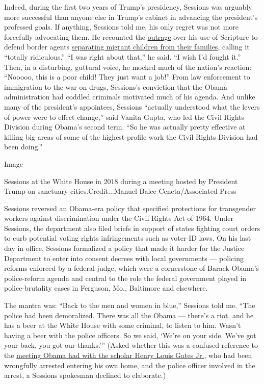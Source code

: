 Indeed, during the first two years of Trump's presidency, Sessions was
arguably more successful than anyone else in Trump's cabinet in
advancing the president's professed goals. If anything, Sessions told
me, his only regret was not more forcefully advocating them. He
recounted the
\href{https://www.nytimes3xbfgragh.onion/2018/06/15/us/sessions-bible-verse-romans.html}{outrage}
over his use of Scripture to defend border agents
\href{https://www.nytimes3xbfgragh.onion/2019/07/16/magazine/immigration-department-of-homeland-security.html}{separating
migrant children from their families}, calling it ``totally
ridiculous.'' ``I was right about that,'' he said. ``I wish I'd fought
it.'' Then, in a disturbing, guttural voice, he mocked much of the
nation's reaction: ``Nooooo, this is a poor child! They just want a
job!'' From law enforcement to immigration to the war on drugs,
Sessions's conviction that the Obama administration had coddled
criminals motivated much of his agenda. And unlike many of the
president's appointees, Sessions ``actually understood what the levers
of power were to effect change,'' said Vanita Gupta, who led the Civil
Rights Division during Obama's second term. ``So he was actually pretty
effective at killing big areas of some of the highest-profile work the
Civil Rights Division had been doing.''

Image

Sessions at the White House in 2018 during a meeting hosted by President
Trump on sanctuary cities.Credit...Manuel Balce Ceneta/Associated Press

Sessions reversed an Obama-era policy that specified protections for
transgender workers against discrimination under the Civil Rights Act of
1964. Under Sessions, the department also filed briefs in support of
states fighting court orders to curb potential voting rights
infringements such as voter-ID laws. On his last day in office, Sessions
formalized a policy that made it harder for the Justice Department to
enter into consent decrees with local governments --- policing reforms
enforced by a federal judge, which were a cornerstone of Barack Obama's
police-reform agenda and central to the role the federal government
played in police-brutality cases in Ferguson, Mo., Baltimore and
elsewhere.

The mantra was: ``Back to the men and women in blue,'' Sessions told me.
``The police had been demoralized. There was all the Obama --- there's a
riot, and he has a beer at the White House with some criminal, to listen
to him. Wasn't having a beer with the police officers. So we said,
`We're on your side. We've got your back, you got our thanks.''' (Asked
whether this was a confused reference to the
\href{https://www.nytimes3xbfgragh.onion/interactive/2020/02/03/magazine/henry-louis-gates-jr-interview.html}{meeting
Obama had with the scholar Henry Louis Gates Jr.}, who had been
wrongfully arrested entering his own home, and the police officer
involved in the arrest, a Sessions spokesman declined to elaborate.)

